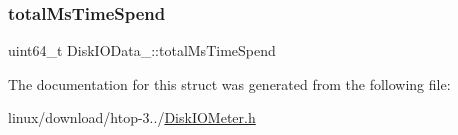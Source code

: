 \mbox{\label{structDiskIOData___a5e6cdf9d3de62cd1f38f032d8510d73d}} 
\subsubsection{\texorpdfstring{total\+Ms\+Time\+Spend}{totalMsTimeSpend}}
{\footnotesize\ttfamily uint64\+\_\+t Disk\+I\+O\+Data\+\_\+\+::total\+Ms\+Time\+Spend}



The documentation for this struct was generated from the following file\+:\begin{DoxyCompactItemize}
\item 
linux/download/htop-\/3../\hyperlink{DiskIOMeter_8h}{Disk\+I\+O\+Meter.\+h}\end{DoxyCompactItemize}
